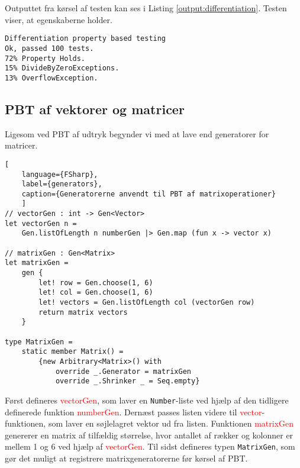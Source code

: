 

Outputtet fra kørsel af testen kan ses i Listing \ref{output:differentiation}. Testen viser, at egenskaberne holder.

\begin{lstlisting}[style=output, caption={Outputtet fra PBT af differentiering af udtryk}, label={output:differentiation}]
Differentiation property based testing
Ok, passed 100 tests.
72% Property Holds.
15% DivideByZeroExceptions.
13% OverflowException.
\end{lstlisting}



\subsection{PBT af vektorer og matricer}
Ligesom ved PBT af udtryk begynder vi med at lave end generatorer for matricer.

\begin{lstlisting}[
    language={FSharp}, 
    label={generators}, 
    caption={Generatorerne anvendt til PBT af matrixoperationer}
    ]
// vectorGen : int -> Gen<Vector>
let vectorGen n =
    Gen.listOfLength n numberGen |> Gen.map (fun x -> vector x)

// matrixGen : Gen<Matrix>
let matrixGen =
    gen {
        let! row = Gen.choose(1, 6)
        let! col = Gen.choose(1, 6)
        let! vectors = Gen.listOfLength col (vectorGen row)
        return matrix vectors
    }

type MatrixGen =
    static member Matrix() =
        {new Arbitrary<Matrix>() with
            override _.Generator = matrixGen
            override _.Shrinker _ = Seq.empty}
\end{lstlisting}

Først defineres \textcolor{red}{vectorGen}, som laver en \texttt{Number}-liste ved hjælp af den tidligere definerede funktion \textcolor{red}{numberGen}. Dernæst passes listen videre til \textcolor{red}{vector}-funktionen, som laver en søjlelagret vektor ud fra listen. Funktionen \textcolor{red}{matrixGen} genererer en matrix af tilfældig størrelse, hvor antallet af rækker og kolonner er mellem 1 og 6 ved hjælp af \textcolor{red}{vectorGen}. Til sidst defineres typen \texttt{MatrixGen}, som gør det muligt at registrere matrixgeneratorerne før kørsel af PBT.

